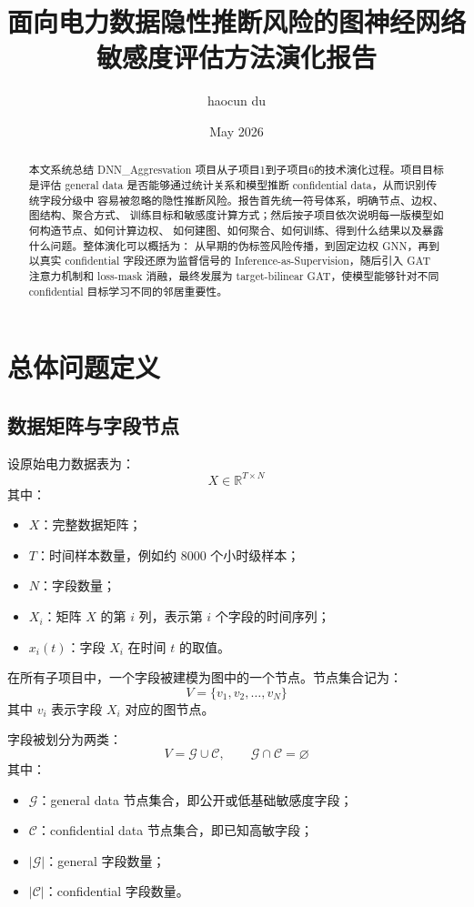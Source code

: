 \documentclass[UTF8]{ctexart}
\title{面向电力数据隐性推断风险的图神经网络敏感度评估方法演化报告}
\author{haocun du}
\date{May 2026}
\begin{document}
\maketitle

\begin{abstract}
本文系统总结 DNN\_Aggresvation 项目从子项目1到子项目6的技术演化过程。项目目标是评估
general data 是否能够通过统计关系和模型推断 confidential data，从而识别传统字段分级中
容易被忽略的隐性推断风险。报告首先统一符号体系，明确节点、边权、图结构、聚合方式、
训练目标和敏感度计算方式；然后按子项目依次说明每一版模型如何构造节点、如何计算边权、
如何建图、如何聚合、如何训练、得到什么结果以及暴露什么问题。整体演化可以概括为：
从早期的伪标签风险传播，到固定边权 GNN，再到以真实 confidential 字段还原为监督信号的
Inference-as-Supervision，随后引入 GAT 注意力机制和 loss-mask 消融，最终发展为
target-bilinear GAT，使模型能够针对不同 confidential 目标学习不同的邻居重要性。
\end{abstract}

\section{总体问题定义}

\subsection{数据矩阵与字段节点}

设原始电力数据表为：
\[
X\in\mathbb{R}^{T\times N}
\]
其中：
\begin{itemize}
    \item \(X\)：完整数据矩阵；
    \item \(T\)：时间样本数量，例如约 8000 个小时级样本；
    \item \(N\)：字段数量；
    \item \(X_i\)：矩阵 \(X\) 的第 \(i\) 列，表示第 \(i\) 个字段的时间序列；
    \item \(x_i(t)\)：字段 \(X_i\) 在时间 \(t\) 的取值。
\end{itemize}

在所有子项目中，一个字段被建模为图中的一个节点。节点集合记为：
\[
V=\{v_1,v_2,\ldots,v_N\}
\]
其中 \(v_i\) 表示字段 \(X_i\) 对应的图节点。

字段被划分为两类：
\[
V=\mathcal{G}\cup\mathcal{C},\qquad \mathcal{G}\cap\mathcal{C}=\varnothing
\]
其中：
\begin{itemize}
    \item \(\mathcal{G}\)：general data 节点集合，即公开或低基础敏感度字段；
    \item \(\mathcal{C}\)：confidential data 节点集合，即已知高敏字段；
    \item \(|\mathcal{G}|\)：general 字段数量；
    \item \(|\mathcal{C}|\)：confidential 字段数量。
\end{itemize}
\end{document}
